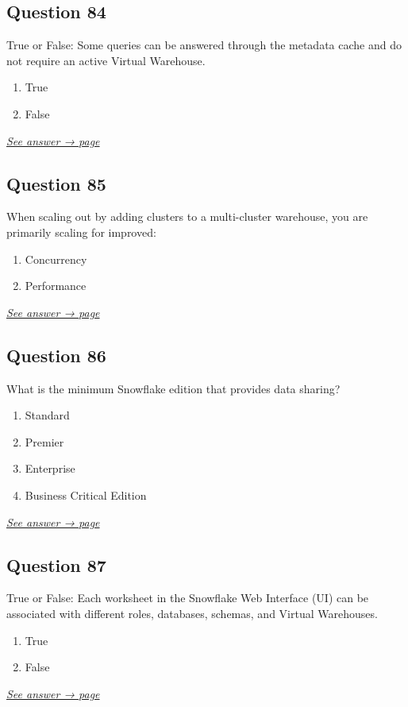 \documentclass[12pt]{article}
\newcommand{\seeanswer}[1]{%
  \par\smallskip\emph{\hyperref[ans:#1]{See answer → page \pageref{ans:#1}}}%
}
\begin{document}
\subsection*{Question 84}\label{q:84}
True or False: Some queries can be answered through the metadata cache and do not require an active Virtual Warehouse.

\begin{enumerate}[label=\Alph*.]
  \item True
  \item False
\end{enumerate}
\seeanswer{84}

\subsection*{Question 85}\label{q:85}
When scaling out by adding clusters to a multi-cluster warehouse, you are primarily scaling for improved:

\begin{enumerate}[label=\Alph*.]
  \item Concurrency
  \item Performance
\end{enumerate}
\seeanswer{85}

\subsection*{Question 86}\label{q:86}
What is the minimum Snowflake edition that provides data sharing?

\begin{enumerate}[label=\Alph*.]
  \item Standard
  \item Premier
  \item Enterprise
  \item Business Critical Edition
\end{enumerate}
\seeanswer{86}

\subsection*{Question 87}\label{q:87}
True or False: Each worksheet in the Snowflake Web Interface (UI) can be associated with different roles, databases, schemas, and Virtual Warehouses.

\begin{enumerate}[label=\Alph*.]
  \item True
  \item False
\end{enumerate}
\seeanswer{87}
\end{document}
